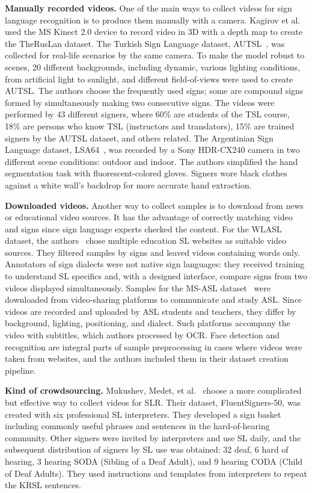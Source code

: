 \documentclass[runningheads]{llncs}
\begin{document}
\textbf{Manually recorded videos.} One of the main ways to collect videos for sign language recognition is to produce them manually with a camera. Kagirov et al.~\cite{kagirov2020theruslan} used the MS Kinect 2.0 device to record video in 3D with a depth map to create the TheRusLan dataset. The Turkish Sign Language dataset, AUTSL~\cite{autosl}, was collected for real-life scenarios by the same camera. To make the model robust to scenes, 20 different backgrounds, including dynamic, various lighting conditions, from artificial light to sunlight, and different field-of-views were used to create AUTSL. The authors choose the frequently used signs; some are compound signs formed by simultaneously making two consecutive signs. The videos were performed by 43 different signers, where 60\% are students of the TSL course, 18\% are persons who know TSL (instructors and translators), 15\% are trained signers by the AUTSL dataset, and others related. The Argentinian Sign Language dataset, LSA64~\cite{lsa}, was recorded by a Sony HDR-CX240 camera in two different scene conditions: outdoor and indoor. The authors simplified the hand segmentation task with fluorescent-colored gloves. Signers wore black clothes against a white wall's backdrop for more accurate hand extraction. 

\textbf{Downloaded videos.} Another way to collect samples is to download from news or educational video sources. It has the advantage of correctly matching video and signs since sign language experts checked the content. For the WLASL dataset, the authors~\cite{wlasl} chose multiple education SL websites as suitable video sources. They filtered samples by signs and leaved videos containing words only. Annotators of sign dialects were not native sign languages: they received training to understand SL specifics and, with a designed interface, compare signs from two videos displayed simultaneously. Samples for the MS-ASL dataset~\cite{msasl} were downloaded from video-sharing platforms to communicate and study ASL. Since videos are recorded and uploaded by ASL students and teachers, they differ by background, lighting, positioning, and dialect. Such platforms accompany the video with subtitles, which authors processed by OCR. Face detection and recognition are integral parts of sample preprocessing in cases where videos were taken from websites, and the authors included them in their dataset creation pipeline. 

\textbf{Kind of crowdsourcing.} Mukushev, Medet, et al.~\cite{mukushev2022fluentsigners} choose a more complicated but effective way to collect videos for SLR. Their dataset, FluentSigners-50, was created with six professional SL interpreters. They developed a sign basket including commonly useful phrases and sentences in the hard-of-hearing community. Other signers were invited by interpreters and use SL daily, and the subsequent distribution of signers by SL use was obtained: 32 deaf, 6 hard of hearing, 3 hearing SODA (Sibling of a Deaf Adult), and 9 hearing CODA (Child of Deaf Adults). They used instructions and templates from interpreters to repeat the KRSL sentences.
\end{document}
